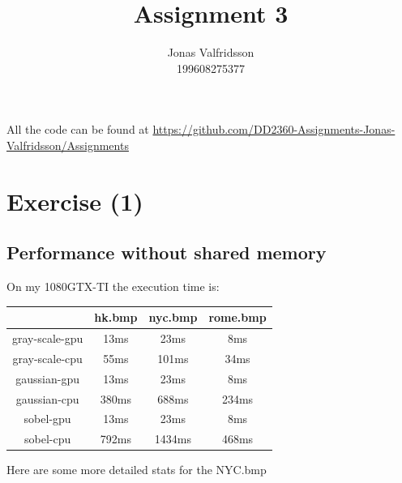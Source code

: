 \documentclass{article}
\title{Assignment 3}
\date{}
\author{Jonas Valfridsson\\199608275377}
\begin{document}
\maketitle
\tableofcontents




All the code can be found at \href{https://github.com/DD2360-Assignments-Jonas-Valfridsson/Assignments}{https://github.com/DD2360-Assignments-Jonas-Valfridsson/Assignments}

\newpage  


\section{Exercise (1)}%

\subsection{Performance without shared memory}%
\label{ssub:performance_of_shared_memory}



On my 1080GTX-TI the execution time is:

\begin{center}
  \begin{tabular}{ | c | c | c | c | }
    \hline
    & hk.bmp & nyc.bmp & rome.bmp\\ \hline
    gray-scale-gpu & 13ms & 23ms & 8ms\\ \hline
    gray-scale-cpu & 55ms & 101ms & 34ms\\ \hline
    gaussian-gpu & 13ms & 23ms & 8ms\\ \hline
    gaussian-cpu & 380ms & 688ms & 234ms \\ \hline
    sobel-gpu & 13ms & 23ms & 8ms \\  \hline
    sobel-cpu & 792ms & 1434ms & 468ms \\  \hline
    \hline
  \end{tabular}
\end{center}

Here are some more detailed stats for the NYC.bmp
\end{document}
